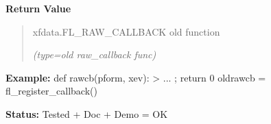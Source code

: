 \begin{boxedminipage}{\funcwidth}
      \textbf{Return Value}
    \vspace{-1ex}

      \begin{quote}
      xfdata.FL\_RAW\_CALLBACK old function

      {\it (type=old raw\_callback func)}

      \end{quote}

\textbf{Example:} def rawcb(pform, xev): {\textgreater} ... ; return 0 oldrawcb = 
fl\_register\_callback()



\textbf{Status:} Tested + Doc + Demo = OK



    \end{boxedminipage}

    \label{xformslib:library:fl_register_raw_callback}

    \vspace{0.5ex}

